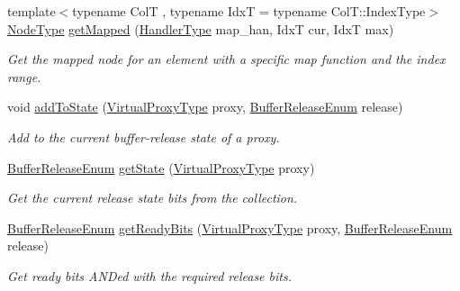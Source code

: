 \begin{DoxyCompactItemize}
{\footnotesize template$<$typename ColT , typename IdxT  = typename Col\+T\+::\+Index\+Type$>$ }\\\hyperlink{namespacevt_a866da9d0efc19c0a1ce79e9e492f47e2}{Node\+Type} \hyperlink{structvt_1_1vrt_1_1collection_1_1_collection_manager_a59cb33eb7e68fc9625a35ccf654de4ff}{get\+Mapped} (\hyperlink{namespacevt_af64846b57dfcaf104da3ef6967917573}{Handler\+Type} map\+\_\+han, IdxT cur, IdxT max)
\begin{DoxyCompactList}\small\item\em Get the mapped node for an element with a specific map function and the index range. \end{DoxyCompactList}\item 
void \hyperlink{structvt_1_1vrt_1_1collection_1_1_collection_manager_ae3dd7660105118c1ee14a125104313c6}{add\+To\+State} (\hyperlink{namespacevt_a1b417dd5d684f045bb58a0ede70045ac}{Virtual\+Proxy\+Type} proxy, \hyperlink{namespacevt_1_1vrt_1_1collection_a2545006e681bacc1f00be9d5d6bdc8fa}{Buffer\+Release\+Enum} release)
\begin{DoxyCompactList}\small\item\em Add to the current buffer-\/release state of a proxy. \end{DoxyCompactList}\item 
\hyperlink{namespacevt_1_1vrt_1_1collection_a2545006e681bacc1f00be9d5d6bdc8fa}{Buffer\+Release\+Enum} \hyperlink{structvt_1_1vrt_1_1collection_1_1_collection_manager_a9ee1d50fcf5ad149307c467bdd49de0a}{get\+State} (\hyperlink{namespacevt_a1b417dd5d684f045bb58a0ede70045ac}{Virtual\+Proxy\+Type} proxy)
\begin{DoxyCompactList}\small\item\em Get the current release state bits from the collection. \end{DoxyCompactList}\item 
\hyperlink{namespacevt_1_1vrt_1_1collection_a2545006e681bacc1f00be9d5d6bdc8fa}{Buffer\+Release\+Enum} \hyperlink{structvt_1_1vrt_1_1collection_1_1_collection_manager_aa6872852acd04a94e2bff5addad2ad06}{get\+Ready\+Bits} (\hyperlink{namespacevt_a1b417dd5d684f045bb58a0ede70045ac}{Virtual\+Proxy\+Type} proxy, \hyperlink{namespacevt_1_1vrt_1_1collection_a2545006e681bacc1f00be9d5d6bdc8fa}{Buffer\+Release\+Enum} release)
\begin{DoxyCompactList}\small\item\em Get ready bits A\+ND\textquotesingle{}ed with the required release bits. \end{DoxyCompactList}\item 

\end{DoxyCompactItemize}
